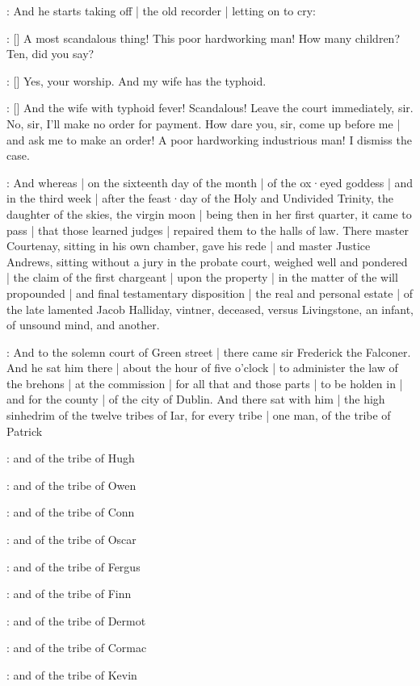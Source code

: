 \Nq:
And he starts taking off |
the old recorder |
letting on to cry:

\bergan:
[]
A most scandalous thing!
This poor hardworking man!
How many children?
Ten,
did you say?

\bergan:
[]
Yes,
your worship.
And my wife has the typhoid.

\bergan:
[]
And the wife with typhoid fever!
Scandalous!
Leave the court immediately,
sir.
No,
sir,
I'll make no order for payment.
How dare you,
sir,
come up before me |
and ask me to make an order!
A poor hardworking industrious man!
I dismiss the case.

:
And whereas |
on the sixteenth day of the month |
of the ox·eyed goddess |
and in the third week |
after the feast·day of the Holy and Undivided Trinity,
the daughter of the skies,
the virgin moon |
being then in her first quarter,
it came to pass |
that those learned judges |
repaired them to the halls of law.
There master Courtenay,
sitting in his own chamber,
gave his rede |
and master Justice Andrews,
sitting without a jury in the probate court,
weighed well and pondered |
the claim of the first chargeant |
upon the property |
in the matter of the will propounded |
and final testamentary disposition |
 the real and personal estate |
of the late lamented Jacob Halliday,
vintner,
deceased,
versus Livingstone,
an infant,
of unsound mind,
and another.

:
And to the solemn court of Green street |
there came sir Frederick the Falconer.
And he sat him there |
about the hour of five o'clock |
to administer the law of the brehons |
at the commission |
for all that and those parts |
to be holden in |
and for the county |
of the city of Dublin.
And there sat with him |
the high sinhedrim of the twelve tribes of Iar,
for every tribe |
one man,
of the tribe of Patrick

:
and of the tribe of Hugh

:
and of the tribe of Owen

:
and of the tribe of Conn

:
and of the tribe of Oscar

:
and of the tribe of Fergus

:
and of the tribe of Finn

:
and of the tribe of Dermot

:
and of the tribe of Cormac

:
and of the tribe of Kevin

